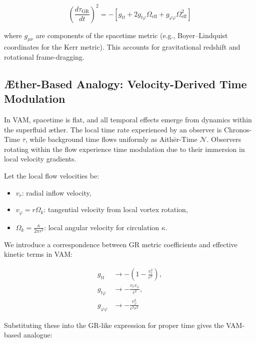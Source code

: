 \documentclass[preprint]{revtex4-2}
\begin{document}
\begin{equation}
 \left( \frac{d\tau_{\text{GR}}}{dt} \right)^2 = -\left[ g_{tt} + 2g_{t\varphi} \Omega_\text{eff} + g_{\varphi\varphi} \Omega_\text{eff}^2 \right]
 \label{eq:GR_proper_time}
\end{equation}

where \( g_{\mu\nu} \) are components of the spacetime metric (e.g., Boyer–Lindquist coordinates for the Kerr metric). This accounts for gravitational redshift and rotational frame-dragging.

\subsection{Æther-Based Analogy: Velocity-Derived Time Modulation}

In VAM, spacetime is flat, and all temporal effects emerge from dynamics within the superfluid æther. The local time rate experienced by an observer is Chronos-Time \( \tau \), while background time flows uniformly as Aithēr-Time \( \mathcal{N} \). Observers rotating within the flow experience time modulation due to their immersion in local velocity gradients.

Let the local flow velocities be:

\begin{itemize}
 \item \( v_r \): radial inflow velocity,
 \item \( v_\varphi = r\Omega_k \): tangential velocity from local vortex rotation,
 \item \( \Omega_k = \frac{\kappa}{2\pi r^2} \): local angular velocity for circulation \( \kappa \).
\end{itemize}

We introduce a correspondence between GR metric coefficients and effective kinetic terms in VAM:

\begin{equation}
 \begin{aligned}
  g_{tt} &\rightarrow -\left(1 - \frac{v_r^2}{c^2}\right), \\
  g_{t\varphi} &\rightarrow -\frac{v_r v_\varphi}{c^2}, \\
  g_{\varphi\varphi} &\rightarrow -\frac{v_\varphi^2}{c^2 r^2}
 \end{aligned}
 \label{eq:VAM_metric_terms}
\end{equation}

Substituting these into the GR-like expression for proper time gives the VAM-based analogue:
\end{document}
